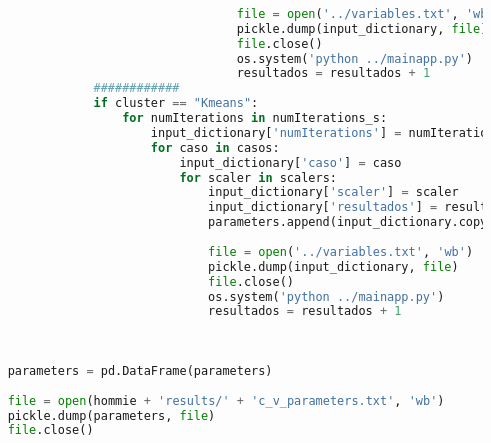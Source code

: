 \documentclass[12pt]{article}
\begin{document}
\begin{lstlisting}[language=Python, 
	caption = Rutina de pruebas CountVectorizer,
	label={lst:pruebasCoVe}]
				
									file = open('../variables.txt', 'wb')
									pickle.dump(input_dictionary, file)
									file.close()
									os.system('python ../mainapp.py')
									resultados = resultados + 1 
				############
				if cluster == "Kmeans":
					for numIterations in numIterations_s:
						input_dictionary['numIterations'] = numIterations              
						for caso in casos:
							input_dictionary['caso'] = caso
							for scaler in scalers:
								input_dictionary['scaler'] = scaler
								input_dictionary['resultados'] = resultados      
								parameters.append(input_dictionary.copy())                              
	
								file = open('../variables.txt', 'wb')
								pickle.dump(input_dictionary, file)
								file.close()
								os.system('python ../mainapp.py')
								resultados = resultados + 1 
					
	
	
	parameters = pd.DataFrame(parameters)
	
	file = open(hommie + 'results/' + 'c_v_parameters.txt', 'wb')
	pickle.dump(parameters, file)
	file.close()
	
	\end{lstlisting}
	
	
	
\end{document}
